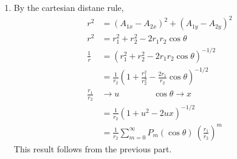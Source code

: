 \begin{enumerate}
\begin{enumerate}
              \item By the cartesian distane rule,
                    \begin{align}
                        r^2             & = (A_{1x} - A_{2x})^2
                        + (A_{1y} - A_{2y})^2                                    \\
                        r^2             & = r_1^2 + r_2^2 - 2r_1 r_2 \cos \theta \\
                        \frac{1}{r}     & = \left( r_1^2 + r_2^2
                        - 2r_1 r_2 \cos \theta \right) ^{-1/2}                   \\
                                        & = \frac{1}{r_2} \left( 1
                        + \frac{r_1^2}{r_2^2}
                        - \frac{2r_1}{r_2} \cos \theta \right)^{-1/2}            \\
                        \frac{r_1}{r_2} & \to u\qquad \qquad
                        \cos\theta \to x                                         \\
                                        & = \frac{1}{r_2} (1 + u^2 - 2ux)^{-1/2} \\
                                        & = \frac{1}{r_2} \sum_{m = 0}^{\infty}
                        P_m(\cos \theta)\ \left( \frac{r_1}{r_2} \right)^m
                    \end{align}
                    This result follows from the previous part.


\end{enumerate}
\end{enumerate}

